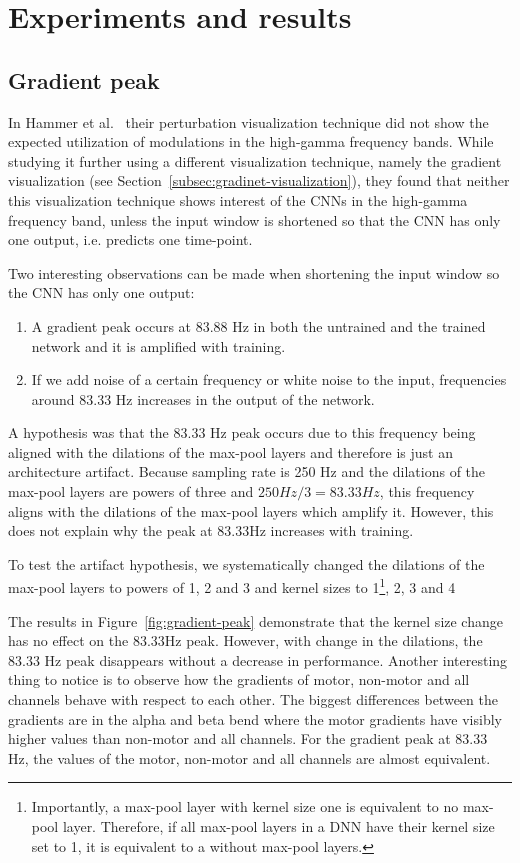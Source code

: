 \chapter{Experiments and results}
\label{ch:exp}

\section{Gradient peak}\label{sec:gradient-peak}
In Hammer et al.~\cite{Hammer-2021} their perturbation visualization technique did not show the expected utilization of modulations in the high-gamma frequency bands.
While studying it further using a different visualization technique, namely the gradient visualization (see Section~\ref{subsec:gradinet-visualization}), they found that neither this visualization technique shows interest of the CNNs in the high-gamma frequency band, unless the input window is shortened so that the CNN has only one output, i.e. predicts one time-point.

Two interesting observations can be made when shortening the input window so the CNN has only one output:
\begin{enumerate}
\item A gradient peak occurs at 83.88 Hz in both the untrained and the trained network and it is amplified with training.
\item If we add noise of a certain frequency or white noise to the input, frequencies around 83.33 Hz increases in the output of the network.
\end{enumerate}

A hypothesis was that the 83.33 Hz peak occurs due to this frequency being aligned with the dilations of the max-pool layers and therefore is just an architecture artifact.
Because sampling rate is 250 Hz and the dilations of the max-pool layers are powers of three and $250 Hz / 3 = 83.33 Hz$, this frequency aligns with the dilations of the max-pool layers which amplify it.
However, this does not explain why the peak at 83.33Hz increases with training.

To test the artifact hypothesis, we systematically changed the dilations of the max-pool layers to powers of 1, 2 and 3 and kernel sizes to 1\footnote{Importantly, a max-pool layer with kernel size one is equivalent to no max-pool layer. Therefore, if all max-pool layers in a DNN have their kernel size set to 1, it is equivalent to a  without max-pool layers.}, 2, 3 and 4

The results in Figure~\ref{fig:gradient-peak} demonstrate that the kernel size change has no effect on the 83.33Hz peak.
However, with change in the dilations, the 83.33 Hz peak disappears without a decrease in performance.
Another interesting thing to notice is to observe how the gradients of motor, non-motor and all channels behave with respect to each other.
The biggest differences between the gradients are in the alpha and beta bend where the motor gradients have visibly higher values than non-motor and all channels.
For the gradient peak at 83.33 Hz, the values of the motor, non-motor and all channels are almost equivalent.

